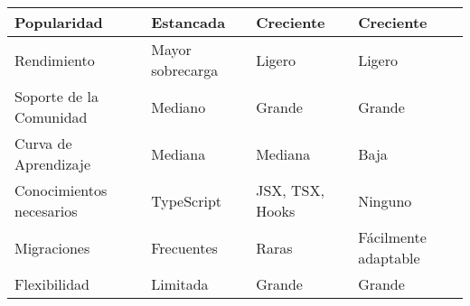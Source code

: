 \begin{longtable}{|p{3cm}|p{3cm}|p{3cm}|p{3cm}|}
    \hline \hline
    \endlastfoot
    Popularidad                                    & Estancada                              & Creciente                              & Creciente                                                                          \\\hline
    Rendimiento                                    & Mayor sobrecarga                       & Ligero                                 & Ligero                                                                             \\\hline
    Soporte de la Comunidad                        & Mediano                                & Grande                                 & Grande                                                                             \\\hline
    Curva de Aprendizaje                           & Mediana                                & Mediana                                & Baja                                                                               \\\hline
    Conocimientos necesarios                       & TypeScript                             & JSX, TSX, Hooks                        & Ninguno                                                                            \\\hline
    Migraciones                                    & Frecuentes                             & Raras                                  & Fácilmente adaptable                                                               \\\hline
    Flexibilidad                                   & Limitada                               & Grande                                 & Grande                                                                             \\
\end{longtable}